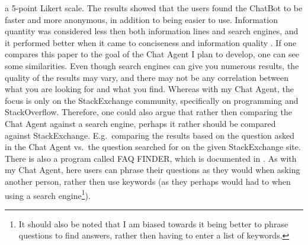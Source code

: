 a 5-point Likert scale. The results showed that the users found the ChatBot to be faster and more anonymous, in addition to being easier to use. Information quantity was 
considered less then both information lines and search engines, and it performed better when it came to conciseness and information quality \citet[p.~517-518]{Crutzen2011}.
\vspace{0.5em}\newline
If one compares this paper to the goal of the Chat Agent I plan to develop, one can see some similarities. Even though search engines can give you numerous results, the quality 
of the results may vary, and there may not be any correlation between what you are looking for and what you find. Whereas with my Chat Agent, the focus is only on the StackExchange 
community, specifically on programming and StackOverflow. Therefore, one could also argue that rather then comparing the Chat Agent against a search engine, perhaps it rather should 
be compared against StackExchange. E.g.~comparing the results based on the question asked in the Chat Agent vs.~the question searched for on the given StackExchange site.
\vspace{0.5em}\newline
There is also a program called FAQ FINDER, which is documented in \citet{Burke1997}. As with my Chat Agent, here users can phrase their questions as they would when asking another 
person, rather then use keywords (as they perhaps would had to when using a search engine\footnote{It should also be noted that I am biased towards it being better to phrase questions 
	to find answers, rather then having to enter a list of keywords.}). 

